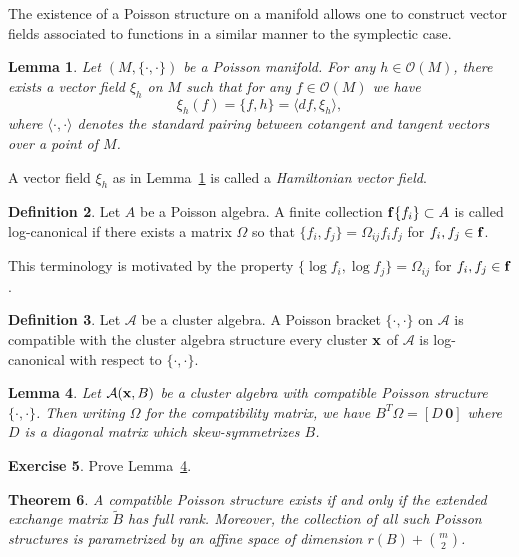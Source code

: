\documentclass{amsart}
\newtheorem{theorem}{Theorem}[section]
\newtheorem{lemma}[theorem]{Lemma}
\theoremstyle{definition}
\newtheorem{definition}[theorem]{Definition}
\newtheorem{exercise}[theorem]{Exercise}
\theoremstyle{remark}
\numberwithin{equation}{section}
\newcommand{\cA}{{\mathcal{A}}}
\newcommand{\cO}{{\mathcal{O}}}
\newcommand{\bff}{{\bf f}}
\newcommand{\bx}{{\bf x}}
\begin{document}
  The existence of a Poisson structure on a manifold allows one to construct vector fields associated to functions in a similar manner to the symplectic case.
  \begin{lemma}\label{le:Hamiltonian vector fields}
    Let $(M,\{\cdot,\cdot\})$ be a Poisson manifold.  For any $h\in\cO(M)$, there exists a vector field $\xi_h$ on $M$ such that for any $f\in\cO(M)$ we have
    \[\xi_h(f)=\{f,h\}=\langle df,\xi_h\rangle,\]
    where $\langle\cdot,\cdot\rangle$ denotes the standard pairing between cotangent and tangent vectors over a point of $M$.
  \end{lemma}
  A vector field $\xi_h$ as in Lemma~\ref{le:Hamiltonian vector fields} is called a \emph{Hamiltonian vector field}.  


  \begin{definition}
    Let $A$ be a Poisson algebra.  A finite collection $\bff\{f_i\}\subset A$ is called log-canonical if there exists a matrix $\Omega$ so that $\{f_i,f_j\}=\Omega_{ij}f_if_j$ for $f_i,f_j\in\bff$.
  \end{definition}
  This terminology is motivated by the property $\{\log f_i,\log f_j\}=\Omega_{ij}$ for $f_i,f_j\in\bff$.

  \begin{definition}
    Let $\cA$ be a cluster algebra.  A Poisson bracket $\{\cdot,\cdot\}$ on $\cA$ is compatible with the cluster algebra structure every cluster $\bx$ of $\cA$ is log-canonical with respect to $\{\cdot,\cdot\}$.
  \end{definition}

  \begin{lemma}
  \label{le:compatibility}
    Let $\cA(\bx,B)$ be a cluster algebra with compatible Poisson structure $\{\cdot,\cdot\}$.  Then writing $\Omega$ for the compatibility matrix, we have $B^T\Omega=[D\, \boldsymbol{0}]$ where $D$ is a diagonal matrix which skew-symmetrizes $B$.
  \end{lemma}
  \begin{exercise}
    Prove Lemma~\ref{le:compatibility}. 
  \end{exercise}

  \begin{theorem}
    A compatible Poisson structure exists if and only if the extended exchange matrix $\tilde B$ has full rank.  Moreover, the collection of all such Poisson structures is parametrized by an affine space of dimension $r(B)+{m\choose 2}$.
  \end{theorem}
\end{document}
